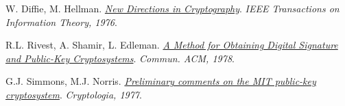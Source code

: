 \documentclass[twoside,symmetric,justified,openany,nobib]{tufte-book}
\begin{document}


% 
% 

% 




\renewcommand{\bibname}{\hspace{.05cm}\normalfont\textbf{Bibliografia}}%
\begin{thebibliography}{99}
\begin{tcolorbox}[enhanced, breakable, colback=white, colframe=white, check odd page, toggle left and right, grow to left by=0.5cm, grow to right by=\marginparwidth+\marginparsep, toggle enlargement=evenpage]

    W. Diffie, M. Hellman.
    \href{https://www-ee.stanford.edu/~hellman/publications/24.pdf}{\textit{New Directions in Cryptography}}.
    \textit{IEEE Transactions on Information Theory, 1976}.
    

    R.L. Rivest, A. Shamir, L. Edleman.
    \href{https://people.csail.mit.edu/rivest/Rsapaper.pdf}{\textit{A Method for Obtaining Digital Signature and Public-Key Cryptosystems}}.
    \textit{Commun. ACM, 1978}.
    

    G.J. Simmons, M.J. Norris.
    \href{http://www.tandfonline.com/doi/abs/10.1080/0161-117791833219}{\textit{Preliminary comments on the MIT public-key cryptosystem}}.
    \textit{Cryptologia, 1977}.
  


\end{tcolorbox}
\end{thebibliography}
\end{document}
